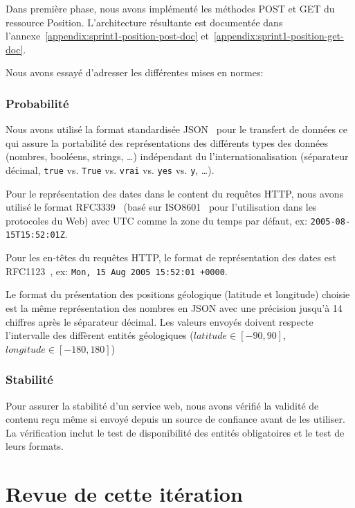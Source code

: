 Dans première phase, nous avons implémenté les méthodes POST et GET du
ressource Position. L'architecture résultante est documentée dans
l'annexe~\ref{appendix:sprint1-position-post-doc}
et~\ref{appendix:sprint1-position-get-doc}.

Nous avons essayé d'adresser les différentes mises en normes:

\subsubsection{Probabilité}

Nous avons utilisé la format standardisée JSON~\cite{ECMA-404} pour le
transfert de données ce qui assure la portabilité des représentations des
différents types des données (nombres, booléens, strings, \ldots) indépendant
du l'internationalisation (séparateur décimal, \verb|true| vs. \verb|True| vs.
\verb|vrai| vs. \verb|yes| vs. \verb|y|, \ldots).

Pour le représentation des dates dans le content du requêtes HTTP, nous avons
utilisé le format RFC3339~\cite{RFC3339} (basé sur ISO8601~\cite{ISO8601} pour
l'utilisation dans les protocoles du Web) avec UTC comme la zone du temps par
défaut, ex: \verb|2005-08-15T15:52:01Z|.

Pour les en-têtes du requêtes HTTP, le format de représentation des dates est
RFC1123~\cite{RFC1123}, ex: \verb|Mon, 15 Aug 2005 15:52:01 +0000|.

Le format du présentation des positions géologique (latitude et longitude)
choisie est la même représentation des nombres en JSON avec une précision
jusqu'à 14 chiffres après le séparateur décimal. Les valeurs envoyés doivent
respecte l'intervalle des diffèrent entités géologiques ($latitude \in [-90,
90]$, $longitude \in [-180, 180]$)

\subsubsection{Stabilité}

Pour assurer la stabilité d'un service web, nous avons vérifié la validité de
contenu reçu même si envoyé depuis un source de confiance avant de les
utiliser. La vérification inclut le test de disponibilité des entités
obligatoires et le test de leurs formats.

\section{Revue de cette itération}

